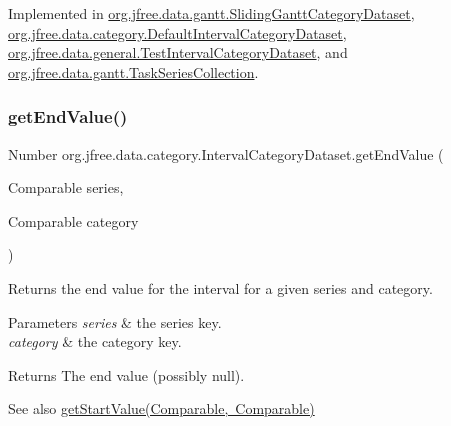 Implemented in \mbox{\hyperlink{classorg_1_1jfree_1_1data_1_1gantt_1_1_sliding_gantt_category_dataset_a5a3c5ebada67a763d8585d3b7950ebe4}{org.\+jfree.\+data.\+gantt.\+Sliding\+Gantt\+Category\+Dataset}}, \mbox{\hyperlink{classorg_1_1jfree_1_1data_1_1category_1_1_default_interval_category_dataset_a4b514652a603f11d569d6797bd0bbe61}{org.\+jfree.\+data.\+category.\+Default\+Interval\+Category\+Dataset}}, \mbox{\hyperlink{classorg_1_1jfree_1_1data_1_1general_1_1_test_interval_category_dataset_afa3067d374cf2eb3258450ead75d2cb8}{org.\+jfree.\+data.\+general.\+Test\+Interval\+Category\+Dataset}}, and \mbox{\hyperlink{classorg_1_1jfree_1_1data_1_1gantt_1_1_task_series_collection_abbfc5aad2b32ff17739295460335f57e}{org.\+jfree.\+data.\+gantt.\+Task\+Series\+Collection}}.

\mbox{\label{interfaceorg_1_1jfree_1_1data_1_1category_1_1_interval_category_dataset_a2801c0f15eab2373ff828698f768a4b5}} 
\subsubsection{\texorpdfstring{get\+End\+Value()}{getEndValue()}\hspace{0.1cm}{\footnotesize\ttfamily [2/2]}}
{\footnotesize\ttfamily Number org.\+jfree.\+data.\+category.\+Interval\+Category\+Dataset.\+get\+End\+Value (\begin{DoxyParamCaption}\item[{Comparable}]{series,  }\item[{Comparable}]{category }\end{DoxyParamCaption})}

Returns the end value for the interval for a given series and category.


\begin{DoxyParams}{Parameters}
{\em series} & the series key. \\
\hline
{\em category} & the category key.\\
\hline
\end{DoxyParams}
\begin{DoxyReturn}{Returns}
The end value (possibly {\ttfamily null}).
\end{DoxyReturn}
\begin{DoxySeeAlso}{See also}
\mbox{\hyperlink{interfaceorg_1_1jfree_1_1data_1_1category_1_1_interval_category_dataset_aec932dc7f50bf72be26002494a266e2e}{get\+Start\+Value(\+Comparable, Comparable)}} 
\end{DoxySeeAlso}


